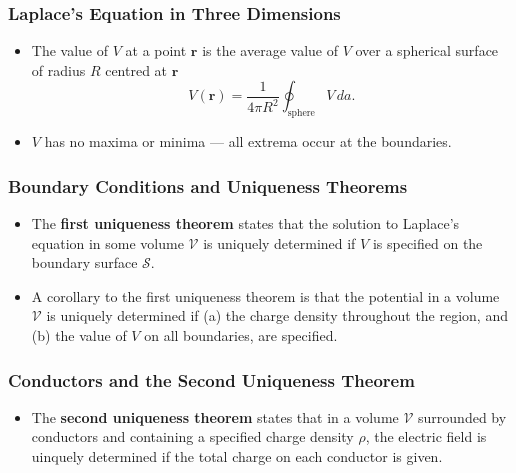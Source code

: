 \documentclass{article}
\renewcommand{\vec}[1]{\boldsymbol{\mathbf{#1}}}
\begin{document}
\subsubsection{Laplace's Equation in Three Dimensions}

\begin{itemize}
  \item The value of $V$ at a point $\vec{r}$ is the average value of $V$ over a spherical surface of radius $R$ centred at $\vec{r}$ \[V(\vec{r}) = \frac{1}{4 \pi R^2} \oint_\text{sphere} V \,d a.\]

  \item $V$ has no maxima or minima — all extrema occur at the boundaries.
\end{itemize}

\subsubsection{Boundary Conditions and Uniqueness Theorems}

\begin{itemize}
  \item The \textbf{first uniqueness theorem} states that the solution to Laplace's equation in some volume $\mathcal{V}$ is uniquely determined if $V$ is specified on the boundary surface $\mathcal{S}$.

  \item A corollary to the first uniqueness theorem is that the potential in a volume $\mathcal{V}$ is uniquely determined if (a) the charge density throughout the region, and (b) the value of $V$ on all boundaries, are specified.
\end{itemize}

\subsubsection{Conductors and the Second Uniqueness Theorem}

\begin{itemize}
  \item The \textbf{second uniqueness theorem} states that in a volume $\mathcal{V}$ surrounded by conductors and containing a specified charge density $\rho$, the electric field is uinquely determined if the total charge on each conductor is given.
\end{itemize}
\end{document}
